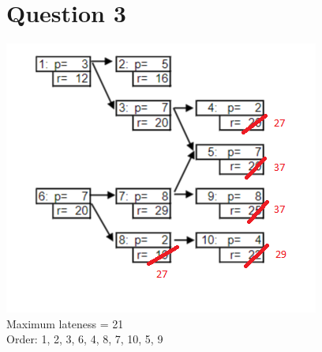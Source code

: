 \documentclass[10pt,a4paper]{article}
\begin{document}
\section*{Question 3}
\includegraphics[width=1\linewidth]{q3}\\
Maximum lateness = 21\\
Order: 1, 2, 3, 6, 4, 8, 7, 10, 5, 9
\newpage	
\thispagestyle{empty}
\end{document}
